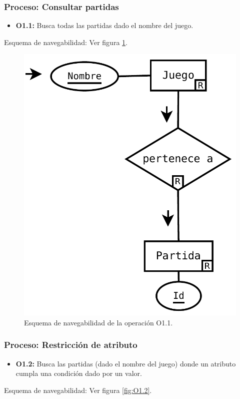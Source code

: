 \subsubsection{Proceso: Consultar partidas}

\begin{itemize}
	\item \textbf{O1.1:} Busca todas las partidas dado el nombre del juego.
\end{itemize}

Esquema de navegabilidad: Ver figura \ref{fig:O1.1}.

\begin{figure}[h!]
	\centering
	\includegraphics[width=0.7\linewidth]{../Diagramas/pdf/Op1-Consulta.pdf}
	\caption{Esquema de navegabilidad de la operación O1.1.}
	
	\label{fig:O1.1}
\end{figure}


\subsubsection{Proceso: Restricción de atributo}

\begin{itemize}
	\item \textbf{O1.2:} Busca las partidas (dado el nombre del juego) donde un atributo cumpla una condición dado por un valor.
\end{itemize}

Esquema de navegabilidad: Ver figura \ref{fig:O1.2}.

